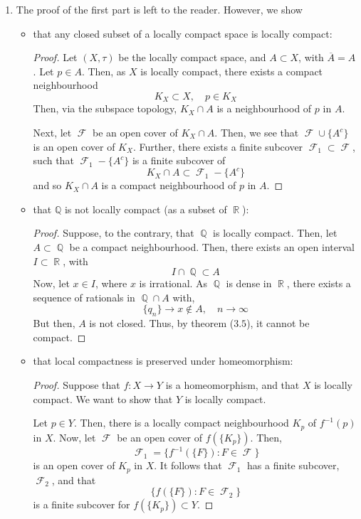 \documentclass{book}
\DeclareMathOperator*{\Q}{\mathbb{Q}}
\DeclareMathOperator*{\R}{\mathbb{R}}
\DeclareMathOperator*{\F}{\mathcal{F}}
\begin{document}
\begin{enumerate}[(1)]
    \item The proof of the first part is left to the reader. However, we show
        \begin{itemize}
            \item that any closed subset of a locally compact space is locally compact: 
                \begin{proof} Let $(X, \tau)$ be the locally compact space, and $A \subset X$, with $\overline{A} =A$. Let $p \in A$. Then, as $X$ is locally compact, there exists a compact neighbourhood \[K_X \subset X, \quad p \in K_X\] 
                    Then, via the subspace topology, $K_X \cap A$ is a neighbourhood of $p$ in $A$. 
                    \par Next, let $\F$ be an open cover of $K_X \cap A$. Then, we see that $\F \cup \{A^c\}$ is an open cover of $K_X$. Further, there exists a finite subcover $\F_1 \subset \F$, such that $\F_1 - \{A^c\}$ is a finite subcover of 
                    \[K_X \cap A \subset \F_1 - \{A^c\}\] 
                    and so $K_X \cap A$ is a compact neighbourhood of $p$ in $A$. 
                \end{proof}
            \item that $\mathbb{Q}$ is not locally compact (as a subset of $\R$): 
                \begin{proof} Suppose, to the contrary, that $\Q$ is locally compact. Then, let $A \subset \Q$ be a compact neighbourhood. Then, there exists an open interval $I \subset \R$, with 
                    \[I \cap \Q \subset A\]
                    Now, let $x \in I$, where $x$ is irrational. As $\Q$ is dense in $\R$, there exists a sequence of rationals in $\Q \cap A$ with, 
                    \[\{q_n\} \rightarrow x \notin A, \quad n \rightarrow \infty \]
                    But then, $A$ is not closed. Thus, by theorem ($3.5$), it cannot be compact. 
                \end{proof}
            \item that local compactness is preserved under homeomorphism: 
                \begin{proof} Suppose that $f: X \rightarrow Y$ is a homeomorphism, and that $X$ is locally compact. We want to show that $Y$ is locally compact. 
                    \par Let $p \in Y$. Then, there is a locally compact neighbourhood $K_p$ of $f^{-1}(p)$ in $X$. Now, let $\F$ be an open cover of $f(\{K_p\})$. Then, 
                    \[\F_1 = \{f^{-1}(\{F\}) : F \in \F \}\]
                    is an open cover of $K_p$ in $X$. It follows that $\F_1$ has a finite subcover, $\F_2$, and that 
                    \[\{f(\{F\}) : F \in \F_2\}\]
                    is a finite subcover for $f(\{K_p\}) \subset Y$. 
                \end{proof}
        \end{itemize}


\end{enumerate}
\end{document}
